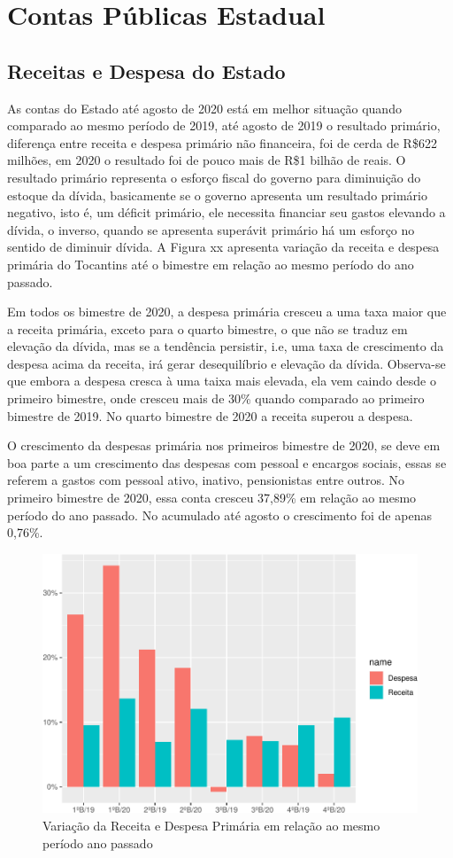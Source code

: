 \chapter{Contas Públicas Estadual}
\section{Receitas e Despesa do
Estado}
As contas do Estado até agosto de 2020 está em melhor situação quando
comparado ao mesmo período de 2019, até agosto de 2019 o resultado
primário, diferença entre receita e despesa primário não financeira, foi
de cerda de R\$622 milhões, em 2020 o resultado foi de pouco mais de
R\$1 bilhão de reais. O resultado primário representa o esforço fiscal
do governo para diminuição do estoque da dívida, basicamente se o
governo apresenta um resultado primário negativo, isto é, um déficit
primário, ele necessita financiar seu gastos elevando a dívida, o
inverso, quando se apresenta superávit primário há um esforço no sentido
de diminuir dívida. A Figura xx apresenta variação da receita e despesa
primária do Tocantins até o bimestre em relação ao mesmo período do ano
passado.

Em todos os bimestre de 2020, a despesa primária cresceu a uma taxa
maior que a receita primária, exceto para o quarto bimestre, o que não
se traduz em elevação da dívida, mas se a tendência persistir, i.e, uma
taxa de crescimento da despesa acima da receita, irá gerar desequilíbrio
e elevação da dívida. Observa-se que embora a despesa cresca à uma taixa
mais elevada, ela vem caindo desde o primeiro bimestre, onde cresceu
mais de 30\% quando comparado ao primeiro bimestre de 2019. No quarto
bimestre de 2020 a receita superou a despesa.

O crescimento da despesas primária nos primeiros bimestre de 2020, se
deve em boa parte a um crescimento das despesas com pessoal e encargos
sociais, essas se referem a gastos com pessoal ativo, inativo,
pensionistas entre outros. No primeiro bimestre de 2020, essa conta
cresceu 37,89\% em relação ao mesmo período do ano passado. No acumulado
até agosto o crescimento foi de apenas 0,76\%.

\begin{figure}[h]
\caption{Variação da Receita e Despesa Primária em relação ao mesmo período ano passado}
\includegraphics[width=\linewidth]{fig/unnamed-chunk-4-1.pdf}
\end{figure}

